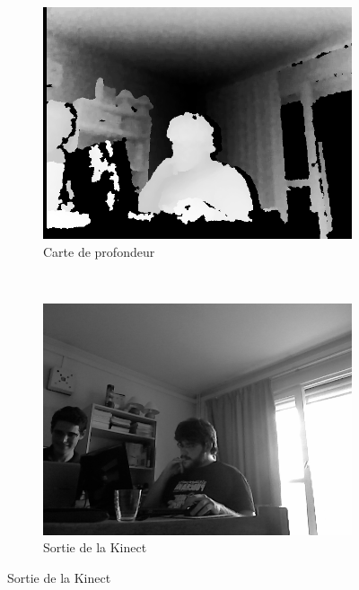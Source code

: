 \documentclass[a4paper,12pt]{article}
\begin{document}
\begin{center} 
  \begin{figure}
    \centering
      \begin{subfigure}[b]{0.3\textwidth}
      \includegraphics[scale=0.25]{img/image00}
      \caption{Carte de profondeur}
      \label{fig:cartedeprofondeur}
      \end{subfigure}%
      ~
      \begin{subfigure}[b]{0.3\textwidth}
        \includegraphics[scale=0.25]{img/image09}
      \caption{Sortie de la Kinect}
      \label{fig:kinectsortie}
      \end{subfigure}%
  \end{figure}
\end{center}
\end{document}
